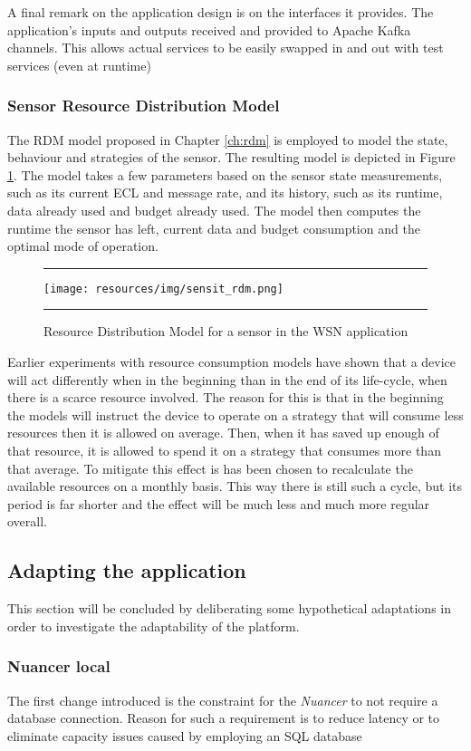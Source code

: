 A final remark on the application design is on the interfaces it provides. The application's inputs and outputs received and provided to Apache Kafka channels. This allows actual services to be easily swapped in and out with test services (even at runtime)

\subsubsection{Sensor Resource Distribution Model}
The RDM model proposed in Chapter \ref{ch:rdm} is employed to model the state, behaviour and strategies of the sensor. The resulting model is depicted in Figure \ref{fig:sensit_rdm}. The model takes a few parameters based on the sensor state measurements, such as its current ECL and message rate, and its history, such as its runtime, data already used and budget already used. The model then computes the runtime the sensor has left, current data and budget consumption and the optimal mode of operation.

\begin{figure}
\centering
\hrule
\texttt{[image: resources/img/sensit\_rdm.png]}
\hrule
\caption{Resource Distribution Model for a sensor in the \idsystems \sensit WSN application}
\label{fig:sensit_rdm}
\end{figure}

Earlier experiments with resource consumption models have shown that a device will act differently when in the beginning than in the end of its life-cycle, when there is a scarce resource involved. The reason for this is that in the beginning the models will instruct the device to operate on a strategy that will consume less resources then it is allowed on average. Then, when it has saved up enough of that resource, it is allowed to spend it on a strategy that consumes more than that average. To mitigate this effect is has been chosen to recalculate the available resources on a monthly basis. This way there is still such a cycle, but its period is far shorter and the effect will be much less and much more regular overall.

\subsection{Adapting the application}
This section will be concluded by deliberating some hypothetical adaptations in order to investigate the adaptability of the platform.

\subsubsection{Nuancer local}
The first change introduced is the constraint for the \emph{Nuancer} to not require a database connection. Reason for such a requirement is to reduce latency or to eliminate capacity issues caused by employing an SQL database

